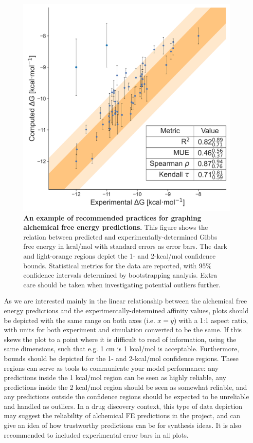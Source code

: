 \documentclass[9pt,bestpractices,pubversion]{livecoms}
\begin{document}
\begin{figure}
  \includegraphics[width=0.95\linewidth]{figures/fig13_analysis_practices/Figure.png}
  \caption{\textbf{An example of recommended practices for graphing alchemical free energy predictions.} This figure shows the relation between predicted and experimentally-determined Gibbs free energy in kcal/mol with standard errors as error bars. The dark and light-orange regions depict the 1- and 2-kcal/mol confidence bounds. Statistical metrics for the data are reported, with 95\% confidence intervals determined by bootstrapping analysis. Extra care should be taken when investigating potential outliers further.}
   \label{fig:scatterplot_analysis}
\end{figure}

As we are interested mainly in the linear relationship between the alchemical free energy predictions and the experimentally-determined affinity values, plots should be depicted with the same range on both axes (i.e. $x=y$) with a 1:1 aspect ratio, with units for both experiment and simulation converted to be the same. If this skews the plot to a point where it is difficult to read of information, using the same dimensions, such that e.g. 1 cm is 1 kcal/mol is acceptable. Furthermore, bounds should be depicted for the 1- and 2-kcal/mol confidence regions. These regions can serve as tools to communicate your model performance: any predictions inside the 1 kcal/mol region can be seen as highly reliable, any predictions inside the 2 kcal/mol region should be seen as somewhat reliable, and any predictions outside the confidence regions should be expected to be unreliable and handled as outliers. In a drug discovery context, this type of data depiction may suggest the reliability of alchemical FE predictions in the project, and can give an idea of how trustworthy predictions can be for synthesis ideas. It is also recommended to included experimental error bars in all plots.
\end{document}
